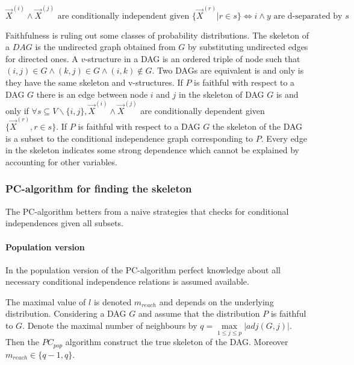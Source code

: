 	$$\vec{X}^{(i)}\land \vec{X}^{(j)}\text{ are conditionally independent given } \{\vec{X}^{(r)}|r\in s\}\Leftrightarrow i\land y \text{ are d-separated by } s$$

	Faithfulness is ruling out some classes of probability distributions.
	The skeleton of a $DAG$ is the undirected graph obtained from $G$ by substituting undirected edges for directed ones.
	A $v$-structure in a DAG is an ordered triple of node such that $(i,j)\in G\land (k,j)\in G\land (i,k)\not\in G$.
	Two DAGs are equivalent is and only is they have the same skeleton and v-structures.
	If $P$ is faithful with respect to a DAG $G$ there is an edge between node $i$ and $j$ in the skeleton of DAG $G$ is and only if $\forall s\subseteq V\backslash\{i,j\}, \vec{X}^{(i)}\land \vec{X}^{(j)}$ are conditionally dependent given $\{\vec{X}^{(r)},r\in s\}$.
	If $P$ is faithful with respect to a DAG $G$ the skeleton of the DAG is a subset to the conditional independence graph corresponding to $P$.
	Every edge in the skeleton indicates some strong dependence which cannot be explained by accounting for other variables.

		\subsubsection{PC-algorithm for finding the skeleton}
		The PC-algorithm betters from a naive strategies that checks for conditional independences given all subsets.

			\paragraph{Population version}
			In the population version of the PC-algorithm perfect knowledge about all necessary conditional independence relations is assumed available.

			

			The maximal value of $l$ is denoted $m_{reach}$ and depends on the underlying distribution.
			Considering a DAG $G$ and assume that the distribution $P$ is faithful to $G$.
			Denote the maximal number of neighbours by $q = \max\limits_{1\le j\le p}|adj(G,j)|$.
			Then the $PC_{pop}$ algorithm construct the true skeleton of the DAG.
			Moreover $m_{reach}\in\{q-1,q\}$.

